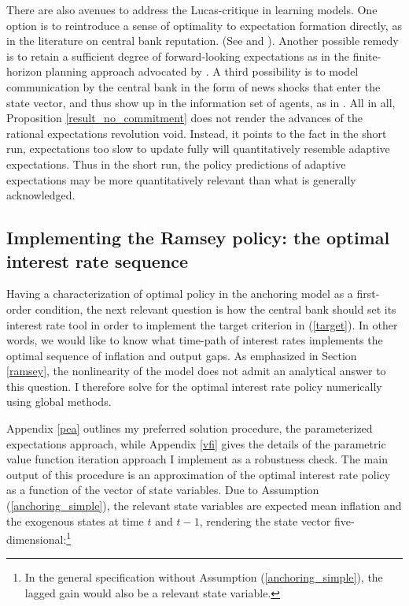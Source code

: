 \documentclass[11pt]{article}
\renewcommand{\[}{\begin{equation}}
\renewcommand{\]}{\end{equation}}
\begin{document}
There are also avenues to address the Lucas-critique in learning models. One option is to reintroduce a sense of optimality to expectation formation directly, as in the literature on central bank reputation. (See \cite{cho1995induction} and \cite{ireland2000expectations}). Another possible remedy is to retain a sufficient degree of forward-looking expectations as in the finite-horizon planning approach advocated by \cite{woodford2019monetary}. A third possibility is to model communication by the central bank in the form of news shocks that enter the state vector, and thus show up in the information set of agents, as in \cite{dombeck2017effects}. All in all, Proposition \ref{result_no_commitment} does not render the advances of the rational expectations revolution void. Instead, it points to the fact in the short run, expectations too slow to update fully will quantitatively resemble adaptive expectations. Thus in the short run, the policy predictions of adaptive expectations may be more quantitatively relevant than what is generally acknowledged.



\subsection{Implementing the Ramsey policy: the optimal interest rate sequence}\label{implement}
Having a characterization of optimal policy in the anchoring model as a first-order condition, the next relevant question is how the central bank should set its interest rate tool in order to implement the target criterion in (\ref{target}). In other words, we would like to know what time-path of interest rates implements the optimal sequence of inflation and output gaps. As emphasized in Section \ref{ramsey}, the nonlinearity of the model does not admit an analytical answer to this question. I therefore solve for the optimal interest rate policy numerically using global methods. 

Appendix \ref{pea} outlines my preferred solution procedure, the parameterized expectations approach, while Appendix \ref{vfi} gives the details of the parametric value function iteration approach I implement as a robustness check. The main output of this procedure is an approximation of the optimal interest rate policy as a function of the vector of state variables. Due to Assumption (\ref{anchoring_simple}), the relevant state variables are expected mean inflation and the exogenous states at time $t$ and $t-1$, rendering the state vector five-dimensional:\footnote{In the general specification without Assumption (\ref{anchoring_simple}), the lagged gain would also be a relevant state variable.}
\end{document}
